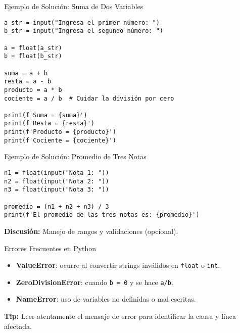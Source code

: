 \documentclass[10pt]{beamer}
\begin{document}
\begin{frame}[fragile]{Ejemplo de Solución: Suma de Dos Variables}
\begin{verbatim}
a_str = input("Ingresa el primer número: ")
b_str = input("Ingresa el segundo número: ")

a = float(a_str)
b = float(b_str)

suma = a + b
resta = a - b
producto = a * b
cociente = a / b  # Cuidar la división por cero

print(f'Suma = {suma}')
print(f'Resta = {resta}')
print(f'Producto = {producto}')
print(f'Cociente = {cociente}')
\end{verbatim}
\end{frame}

\begin{frame}[fragile]{Ejemplo de Solución: Promedio de Tres Notas}
\begin{verbatim}
n1 = float(input("Nota 1: "))
n2 = float(input("Nota 2: "))
n3 = float(input("Nota 3: "))

promedio = (n1 + n2 + n3) / 3
print(f'El promedio de las tres notas es: {promedio}')
\end{verbatim}
\textbf{Discusión:} Manejo de rangos y validaciones (opcional).
\end{frame}

\begin{frame}{Errores Frecuentes en Python}
  \begin{itemize}
    \item \textbf{ValueError}: ocurre al convertir strings inválidos en \texttt{float} o \texttt{int}.
    \item \textbf{ZeroDivisionError}: cuando \texttt{b = 0} y se hace \texttt{a/b}.
    \item \textbf{NameError}: uso de variables no definidas o mal escritas.
  \end{itemize}
  \textbf{Tip:} Leer atentamente el mensaje de error para identificar la causa y línea afectada.
\end{frame}
\end{document}
